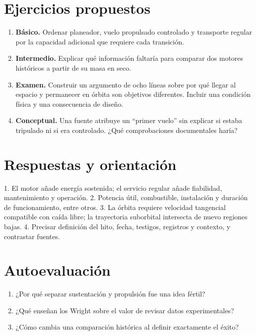 \section{Ejercicios propuestos}
\begin{enumerate}
\item \textbf{Básico.} Ordenar planeador, vuelo propulsado controlado y transporte regular por la capacidad adicional que requiere cada transición.
\item \textbf{Intermedio.} Explicar qué información faltaría para comparar dos motores históricos a partir de su masa en seco.
\item \textbf{Examen.} Construir un argumento de ocho líneas sobre por qué llegar al espacio y permanecer en órbita son objetivos diferentes. Incluir una condición física y una consecuencia de diseño.
\item \textbf{Conceptual.} Una fuente atribuye un ``primer vuelo'' sin explicar si estaba tripulado ni si era controlado. ¿Qué comprobaciones documentales haría?
\end{enumerate}
\section{Respuestas y orientación}
1. El motor añade energía sostenida; el servicio regular añade fiabilidad, mantenimiento y operación. 2. Potencia útil, combustible, instalación y duración de funcionamiento, entre otros. 3. La órbita requiere velocidad tangencial compatible con caída libre; la trayectoria suborbital intersecta de nuevo regiones bajas. 4. Precisar definición del hito, fecha, testigos, registros y contexto, y contrastar fuentes.

\section{Autoevaluación}
\begin{enumerate}
\item ¿Por qué separar sustentación y propulsión fue una idea fértil?
\item ¿Qué enseñan los Wright sobre el valor de revisar datos experimentales?
\item ¿Cómo cambia una comparación histórica al definir exactamente el éxito?
\end{enumerate}
